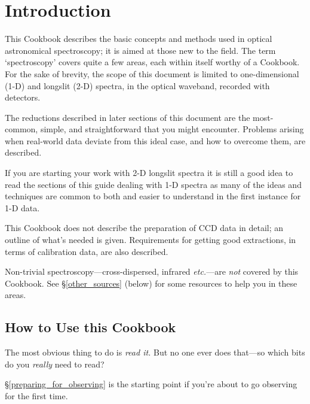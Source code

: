 \documentclass[twoside,11pt]{starlink}
\providecommand{\mlabel}[1]{\xlabel{#1}\label{#1}}
\providecommand{\scspec}[2]{#1}
\begin{document}
\scfrontmatter

\section{\mlabel{introduction}Introduction}


This Cookbook describes the basic concepts and methods used in optical
astronomical spectroscopy; it is aimed at those new to the field.
The term `spectroscopy' covers quite a few areas, each within itself
worthy of a Cookbook.
For the sake of brevity, the scope of this document is limited to
one-dimensional (1-D) and longslit (2-D) spectra, in the optical
waveband, recorded with  detectors.

The reductions described in later sections of this document are the
most-common, simple, and straightforward that you might encounter.
Problems arising when real-world data deviate from this ideal case,
and how to overcome them, are described.

If you are starting your work with 2-D longslit spectra it is still a
good idea to read the sections of this guide dealing with 1-D spectra
as many of the ideas and techniques are common to both and easier to
understand in the first instance for 1-D data.

This Cookbook does not describe the preparation of CCD data in detail;
an outline of what's needed is given.  Requirements for getting good
extractions, in terms of calibration data, are also described.

Non-trivial spectroscopy\scspec{---}{ - }cross-dispersed, infrared
{\it{etc.}}\scspec{---}{ - }are \emph{not} covered by this Cookbook.
See \scspec{\S\ref{other_sources} (below)}{\htmlref{Other Sources of
Information}{other_sources}} for some resources to help you in these
areas.


\subsection{\mlabel{how_to_use}How to Use this Cookbook}

The most obvious thing to do is \emph{read it.}  But no one ever
does that\scspec{---}{ - }so which bits do you \emph{really} need to read?

\scspec{\S\ref{preparing_for_observing}}{\htmlref{Preparing for
Observing}{preparing_for_observing}} is the starting point if you're
about to go observing for the first time.
\end{document}

